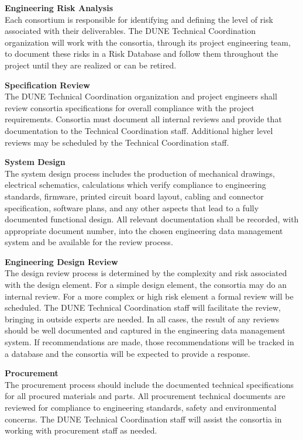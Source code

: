 {\bf Engineering Risk Analysis}\\
Each consortium is responsible for identifying and defining the level
of risk associated with their deliverables.  The DUNE Technical
Coordination organization will work with the consortia, through its
project engineering team, to document these risks in a Risk Database
and follow them throughout the project until they are realized or can
be retired.

{\bf Specification Review}\\
The DUNE Technical Coordination organization and project engineers
shall review consortia specifications for overall compliance with the
project requirements.  Consortia must document all internal reviews
and provide that documentation to the Technical Coordination staff.
Additional higher level reviews may be scheduled by the Technical
Coordination staff.

{\bf System Design}\\
The system design process includes the production of mechanical
drawings, electrical schematics, calculations which verify compliance
to engineering standards, firmware, printed circuit board layout,
cabling and connector specification, software plans, and any other
aspects that lead to a fully documented functional design.  All
relevant documentation shall be recorded, with appropriate document
number, into the chosen engineering data management system and be
available for the review process.

{\bf Engineering Design Review}\\
The design review process is determined by the complexity and risk
associated with the design element.  For a simple design element, the
consortia may do an internal review.  For a more complex or high risk
element a formal review will be scheduled.  The DUNE Technical
Coordination staff will facilitate the review, bringing in outside
experts are needed.  In all cases, the result of any reviews should be
well documented and captured in the engineering data management
system.  If recommendations are made, those recommendations will be
tracked in a database and the consortia will be expected to provide a
response.

{\bf Procurement}\\ The procurement process should include the
documented technical specifications for all procured materials and
parts.  All procurement technical documents are reviewed for
compliance to engineering standards, safety and environmental
concerns.  The DUNE Technical Coordination staff will assist the
consortia in working with procurement staff as needed.

